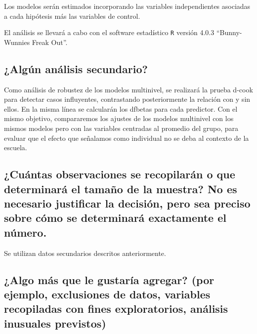 \documentclass[
  12pt,
]{article}
\begin{document}
Los modelos serán estimados incorporando las variables independientes
asociadas a cada hipótesis más las variables de control.

El análisis se llevará a cabo con el software estadístico \texttt{R}
versión 4.0.3 ``Bunny-Wunnies Freak Out''.

\hypertarget{alguxfan-anuxe1lisis-secundario}{%
\subsection{¿Algún análisis
secundario?}\label{alguxfan-anuxe1lisis-secundario}}

Como análisis de robustez de los modelos multinivel, se realizará la
prueba d-cook para detectar casos influyentes, contrastando
posteriormente la relación con y sin ellos. En la misma línea se
calcularán los dfbetas para cada predictor. Con el mismo objetivo,
compararemos los ajustes de los modelos multinivel con los mismos
modelos pero con las variables centradas al promedio del grupo, para
evaluar que el efecto que señalamos como individual no se deba al
contexto de la escuela.

\hypertarget{cuuxe1ntas-observaciones-se-recopilaruxe1n-o-que-determinaruxe1-el-tamauxf1o-de-la-muestra-no-es-necesario-justificar-la-decisiuxf3n-pero-sea-preciso-sobre-cuxf3mo-se-determinaruxe1-exactamente-el-nuxfamero.}{%
\subsection{¿Cuántas observaciones se recopilarán o que determinará el
tamaño de la muestra? No es necesario justificar la decisión, pero sea
preciso sobre cómo se determinará exactamente el
número.}\label{cuuxe1ntas-observaciones-se-recopilaruxe1n-o-que-determinaruxe1-el-tamauxf1o-de-la-muestra-no-es-necesario-justificar-la-decisiuxf3n-pero-sea-preciso-sobre-cuxf3mo-se-determinaruxe1-exactamente-el-nuxfamero.}}

Se utilizan datos secundarios descritos anteriormente.

\hypertarget{algo-muxe1s-que-le-gustaruxeda-agregar-por-ejemplo-exclusiones-de-datos-variables-recopiladas-con-fines-exploratorios-anuxe1lisis-inusuales-previstos}{%
\subsection{¿Algo más que le gustaría agregar? (por ejemplo, exclusiones
de datos, variables recopiladas con fines exploratorios, análisis
inusuales
previstos)}\label{algo-muxe1s-que-le-gustaruxeda-agregar-por-ejemplo-exclusiones-de-datos-variables-recopiladas-con-fines-exploratorios-anuxe1lisis-inusuales-previstos}}
\end{document}
